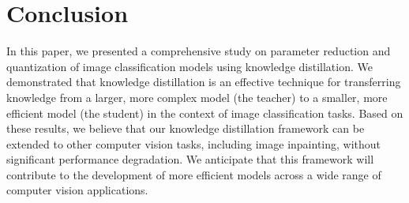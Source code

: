 \section{Conclusion}

In this paper, we presented a comprehensive study
on parameter reduction and quantization of image classification models using knowledge distillation.
We demonstrated that knowledge distillation is an effective technique
for transferring knowledge from a larger, more complex model (the teacher)
to a smaller, more efficient model (the student)
in the context of image classification tasks.
Based on these results, we believe that our knowledge distillation framework can be extended
to other computer vision tasks, including image inpainting,
without significant performance degradation.
We anticipate that this framework will contribute to the development of more efficient models
across a wide range of computer vision applications.
